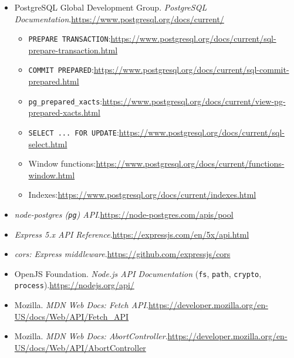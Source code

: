 \documentclass[11pt,letterpaper]{article}
\begin{document}
{\small
\begin{itemize}
    \item PostgreSQL Global Development Group. \emph{PostgreSQL Documentation}.\newline \url{https://www.postgresql.org/docs/current/}
    \begin{itemize}
        \item \texttt{PREPARE TRANSACTION}:\newline \url{https://www.postgresql.org/docs/current/sql-prepare-transaction.html}
        \item \texttt{COMMIT PREPARED}:\newline \url{https://www.postgresql.org/docs/current/sql-commit-prepared.html}
        \item \texttt{pg\_prepared\_xacts}:\newline \url{https://www.postgresql.org/docs/current/view-pg-prepared-xacts.html}
        \item \texttt{SELECT ... FOR UPDATE}:\newline \url{https://www.postgresql.org/docs/current/sql-select.html}
        \item Window functions:\newline \url{https://www.postgresql.org/docs/current/functions-window.html}
        \item Indexes:\newline \url{https://www.postgresql.org/docs/current/indexes.html}
    \end{itemize}
    \item \emph{node-postgres (\texttt{pg}) API}.\newline \url{https://node-postgres.com/apis/pool}
    \item \emph{Express 5.x API Reference}.\newline \url{https://expressjs.com/en/5x/api.html}
    \item \emph{cors: Express middleware}.\newline \url{https://github.com/expressjs/cors}
    \item OpenJS Foundation. \emph{Node.js API Documentation} (\texttt{fs}, \texttt{path}, \texttt{crypto}, \texttt{process}).\newline \url{https://nodejs.org/api/}
    \item Mozilla. \emph{MDN Web Docs: Fetch API}.\newline \url{https://developer.mozilla.org/en-US/docs/Web/API/Fetch_API}
    \item Mozilla. \emph{MDN Web Docs: AbortController}.\newline \url{https://developer.mozilla.org/en-US/docs/Web/API/AbortController}
\end{itemize}
}
\end{document}
